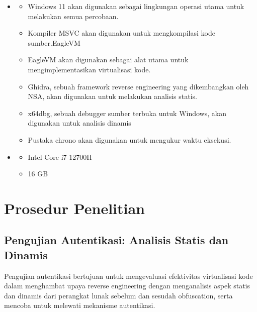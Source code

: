\begin{itemize}
	\item {}
	      \begin{itemize}
		      \item {} Windows 11 akan digunakan sebagai lingkungan operasi utama untuk melakukan semua percobaan.
		      \item {} Kompiler MSVC akan digunakan untuk mengkompilasi kode sumber.EagleVM
		      \item {} EagleVM akan digunakan sebagai alat utama untuk mengimplementasikan virtualisasi kode.
		      \item {} Ghidra, sebuah framework reverse engineering yang dikembangkan oleh NSA, akan digunakan untuk melakukan analisis statis.
		      \item {} x64dbg, sebuah debugger sumber terbuka untuk Windows, akan digunakan untuk analisis dinamis
		      \item {} Pustaka chrono akan digunakan untuk mengukur waktu eksekusi.
	      \end{itemize}
	\item {}
	      \begin{itemize}
		      \item {} Intel Core i7-12700H
		      \item {} 16 GB
	      \end{itemize}
\end{itemize}

\section{Prosedur Penelitian}
\subsection{Pengujian Autentikasi: Analisis Statis dan Dinamis}
Pengujian autentikasi bertujuan untuk mengevaluasi efektivitas virtualisasi kode dalam menghambat upaya reverse engineering dengan menganalisis aspek statis dan dinamis dari perangkat lunak sebelum dan sesudah obfuscation, serta mencoba untuk melewati mekanisme autentikasi.

